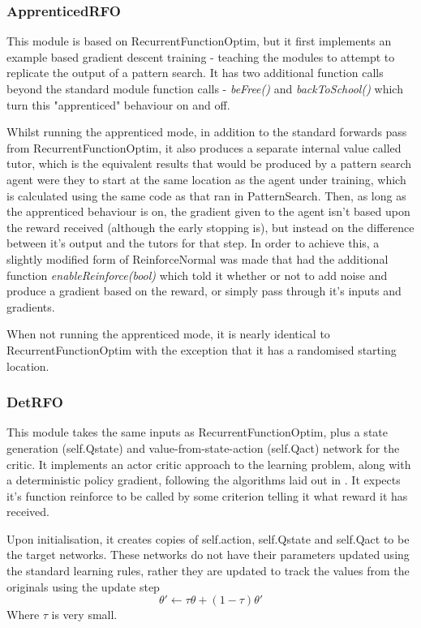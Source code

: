 \subsubsection{ApprenticedRFO}
This module is based on RecurrentFunctionOptim, but it first implements an example based gradient descent training - teaching the modules to attempt to replicate the output of a pattern search. It has two additional function calls beyond the standard module function calls - \emph{beFree()} and \emph{backToSchool()} which turn this "apprenticed" behaviour on and off.

Whilst running the apprenticed mode, in addition to the standard forwards pass from RecurrentFunctionOptim, it also produces a separate internal value called tutor, which is the equivalent results that would be produced by a pattern search agent were they to start at the same location as the agent under training, which is calculated using the same code as that ran in PatternSearch. Then, as long as the apprenticed behaviour is on, the gradient given to the agent isn't based upon the reward received (although the early stopping is), but instead on the difference between it's output and the tutors for that step. In order to achieve this, a slightly modified form of ReinforceNormal was made that had the additional function \emph{enableReinforce(bool)} which told it whether or not to add noise and produce a gradient based on the reward, or simply pass through it's inputs and gradients.

When not running the apprenticed mode, it is nearly identical to RecurrentFunctionOptim with the exception that it has a randomised starting location.

\subsubsection{DetRFO}
This module takes the same inputs as RecurrentFunctionOptim, plus a state generation (self.Qstate) and value-from-state-action (self.Qact) network for the critic. It implements an actor critic approach to the learning problem, along with a deterministic policy gradient, following the algorithms laid out in \cite{lillicrap2015continuous}. It expects it's function reinforce to be called by some criterion telling it what reward it has received.

Upon initialisation, it creates copies of self.action, self.Qstate and self.Qact to be the target networks. These networks do not have their parameters updated using the standard learning rules, rather they are updated to track the values from the originals using the update step \begin{equation}
\theta' \gets \tau \theta + (1 - \tau)\theta'
\end{equation} Where $\tau$ is very small.

